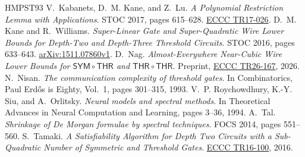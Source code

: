 \documentclass[11pt,letterpaper]{article}
\theoremstyle{remark}
\newcommand{\THR}{\mathsf{THR}}
\begin{document}
\begin{thebibliography}{HMPST93}
 V.~Kabanets, D.~M. Kane, and Z.~Lu.
\emph{A Polynomial Restriction Lemma with Applications}. STOC 2017, pages
615--628.
\href{https://eccc.weizmann.ac.il/report/2017/026/}{ECCC TR17-026}.
 D.~M. Kane and R.~Williams.
\emph{Super-Linear Gate and Super-Quadratic Wire Lower Bounds for Depth-Two
and Depth-Three Threshold Circuits}. STOC 2016, pages 633--643.
\href{https://arxiv.org/abs/1511.07860}{arXiv:1511.07860v1}.
 D.~Nag. \emph{Almost-Everywhere Near-Cubic Wire Lower Bounds for
$\mathsf{SYM}\circ\THR$ and $\THR\circ\THR$}. Preprint,
\href{https://eccc.weizmann.ac.il/report/2026/167/}{ECCC TR26-167}, 2026.
 N.~Nisan. \emph{The communication complexity of
threshold gates}. In Combinatorics, Paul Erd\H{o}s is Eighty, Vol.~1, pages
301--315, 1993.
 V.~P. Roychowdhury, K.-Y. Siu, and A.~Orlitsky.
\emph{Neural models and spectral methods}. In Theoretical Advances in Neural
Computation and Learning, pages 3--36, 1994.
 A.~Tal. \emph{Shrinkage of De Morgan formulae by
spectral techniques}. FOCS 2014, pages 551--560.
 S.~Tamaki. \emph{A Satisfiability Algorithm for Depth Two
Circuits with a Sub-Quadratic Number of Symmetric and Threshold Gates}.
\href{https://eccc.weizmann.ac.il/report/2016/100/}{ECCC TR16-100}, 2016.
\end{thebibliography}
\end{document}
